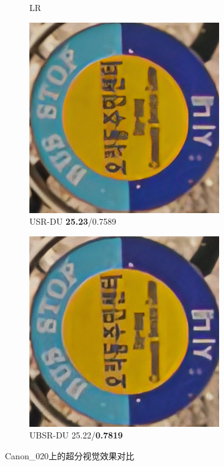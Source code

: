 \begin{figure}[htbp]
\begin{subfigure}{0.3\textwidth}
        \caption{LR} 
    \end{subfigure}
    \hfill
    \begin{subfigure}{0.3\textwidth}
        \includegraphics[width=\linewidth]{imgs/USR_DU_25.23_0.7589_Canon_020.png}
        \caption{USR-DU \textbf{25.23}/0.7589} 
    \end{subfigure}
    \hfill
    \begin{subfigure}{0.3\textwidth}
        \includegraphics[width=\linewidth]{imgs/UBSR_DU_25.22_0.7819_Canon_020.png}
        \caption{UBSR-DU 25.22/\textbf{0.7819}} 
    \end{subfigure}
    \caption{Canon\_020上的超分视觉效果对比}
    \label{fig:Canon020}
\end{figure}


